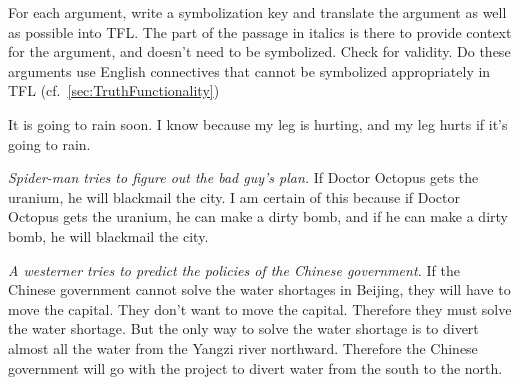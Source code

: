 \begin{practiceproblems}
\problempart
For each argument, write a symbolization key and translate the argument as well as possible into TFL. The part of the passage in italics is there to provide context for the argument, and doesn't need to be symbolized. Check for validity. Do these arguments use English connectives that cannot be symbolized appropriately in TFL (cf.~\cref{sec:TruthFunctionality})
\begin{problemslist}
\item It is going to rain soon. I know because my leg is hurting, and my leg hurts if it's going to rain.



\item  \emph{Spider-man tries to figure out the bad guy's plan.} If Doctor Octopus gets the uranium, he will blackmail the city. I am certain of this because if Doctor Octopus gets the uranium, he can make a dirty bomb, and if he can make a dirty bomb, he will blackmail the city.



\item \emph{A westerner tries to predict the policies of the Chinese government.} If the Chinese government cannot solve the water shortages in Beijing, they will have to move the capital. They don't want to move the capital. Therefore they must solve the water shortage. But the only way to solve the water shortage is to divert almost all the water from the Yangzi river northward. Therefore the Chinese government will go with the project to divert water from the south to the north.




\end{problemslist}
\end{practiceproblems}
